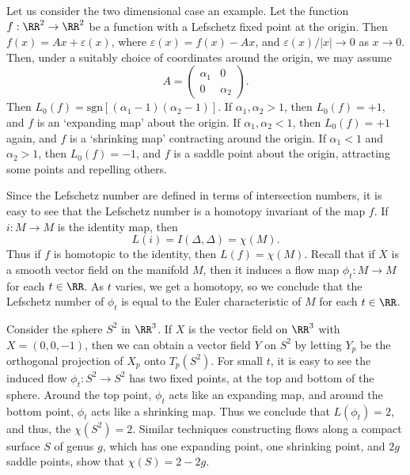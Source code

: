 \begin{example}
    Let us consider the two dimensional case an example. Let the function $f: \RR^2 \to \RR^2$ be a function with a Lefschetz fixed point at the origin. Then $f(x) = Ax + \varepsilon(x)$, where $\varepsilon(x) = f(x) - A x$, and $\varepsilon(x)/|x| \to 0$ as $x \to 0$. Then, under a suitably choice of coordinates around the origin, we may assume
    \[ A = \begin{pmatrix} \alpha_1 & 0 \\ 0 & \alpha_2 \end{pmatrix}. \]
    Then $L_0(f) = \text{sgn}[(\alpha_1 - 1)(\alpha_2 - 1)]$. If $\alpha_1, \alpha_2 > 1$, then $L_0(f) = +1$, and $f$ is an `expanding map' about the origin. If $\alpha_1, \alpha_2 < 1$, then $L_0(f) = +1$ again, and $f$ is a `shrinking map' contracting around the origin. If $\alpha_1 < 1$ and $\alpha_2 > 1$, then $L_0(f) = -1$, and $f$ is a saddle point about the origin, attracting some points and repelling others.
\end{example}

Since the Lefschetz number are defined in terms of intersection numbers, it is easy to see that the Lefschetz number is a homotopy invariant of the map $f$. If $i: M \to M$ is the identity map, then
%
\[ L(i) = I(\Delta,\Delta) = \chi(M). \]
%
Thus if $f$ is homotopic to the identity, then $L(f) = \chi(M)$. Recall that if $X$ is a smooth vector field on the manifold $M$, then it induces a flow map $\phi_t: M \to M$ for each $t \in \RR$. As $t$ varies, we get a homotopy, so we conclude that the Lefschetz number of $\phi_t$ is equal to the Euler characteristic of $M$ for each $t \in \RR$.

\begin{example}
    Consider the sphere $S^2$ in $\RR^3$. If $X$ is the vector field on $\RR^3$ with $X = (0,0,-1)$, then we can obtain a vector field $Y$ on $S^2$ by letting $Y_p$ be the orthogonal projection of $X_p$ onto $T_p(S^2)$. For small $t$, it is easy to see the induced flow $\phi_t: S^2 \to S^2$ has two fixed points, at the top and bottom of the sphere. Around the top point, $\phi_t$ acts like an expanding map, and around the bottom point, $\phi_t$ acts like a shrinking map. Thus we conclude that $L(\phi_t) = 2$, and thus, the $\chi(S^2) = 2$. Similar techniques constructing flows along a compact surface $S$ of genus $g$, which has one expanding point, one shrinking point, and $2g$ saddle points, show that $\chi(S) = 2 - 2g$.
\end{example}

